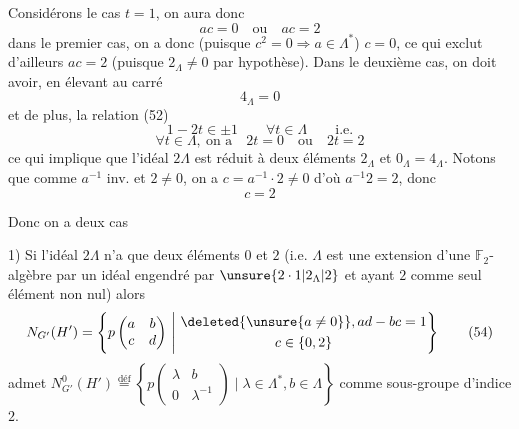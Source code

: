 Considérons le cas $t=1$, on aura donc
\[
ac=0\quad\text{ou}\quad ac=2
\]
dans le premier cas, on a donc (puisque
$c^2=0\Longrightarrow a\in\Lambda^*$) $c=0$, ce qui exclut d'ailleurs
$ac=2$ (puisque $2_\Lambda\ne0$ par hypothèse). Dans
le deuxième cas, on doit avoir, en élevant
au carré
\[
4_\Lambda=0
\]
et de plus, la  relation (52)  
\[
1-2t\in\pm1\qquad\forall t\in\Lambda\qquad\text{i.e.}
\]
\[
\forall t\in\Lambda,\ \text{on a}\quad 2t=0\quad\text{ou}\quad 2t=2\tag*{(53)}
\]
ce qui implique que l'idéal $2\Lambda$ est réduit à deux
éléments $2_\Lambda$ et $0_\Lambda=4_\Lambda$. Notons que comme
$a^{-1}$ inv. et $2\ne0$, on a $c=a^{-1}\cdot2\ne0$ d'où $a^{-1}2=2$,
donc
\[
c=2
\]

Donc on a deux cas

1) Si  l'idéal
$2\Lambda$ n'a que deux éléments $0$ et $2$ (i.e.
$\Lambda$ est une extension d'une $\mathbb F_2$-algèbre  par
un idéal engendré par $\unsure{2\cdot1|2_\Lambda|2}$ et ayant $2$ comme
seul élément non nul) alors
\[
N_{G'}(H')=\left\{p\begin{pmatrix}a&b\\c&d\end{pmatrix}\ \middle|\ 
\begin{gathered}\deleted{\unsure{a\ne0}},ad-bc=1\\c\in\{0,2\}\end{gathered}\right\}\tag*{(54)}
\]
admet $N^0_{G'}(H')\overset{\text{déf}}{=}\left\{p\left(\begin{smallmatrix}\lambda&b\\0&\lambda^{-1}\end{smallmatrix}\right)\mid\lambda\in\Lambda^*,b\in\Lambda\right\}$
comme sous-groupe d'indice $2$.
\margin{en fait, si $\sigma=p\left(\begin{smallmatrix}1&0\\2&1\end{smallmatrix}\right)$ alors $N_{G'}(H')$ est produit \inserted{$1/2$ direct} de $N^0_{G'}(H')$ par $\{1,\sigma\}$. [Le $\sigma$ ou antipodisme a un sens intrinsèque, indépend$^{\text{mt}}$ du choix d'une base}

